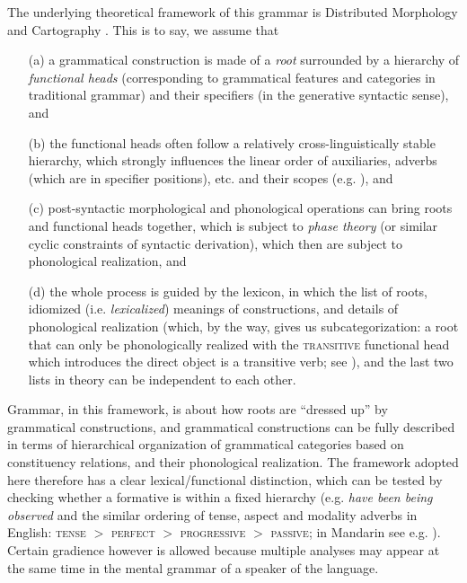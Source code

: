 \documentclass[UTF8, a4paper, oneside, scheme=plain, 12pt]{ctexrep}
\newcommand*{\textgt}{$>$ }
\newcommand*{\term}[1]{\emph{#1}}
\newcommand{\form}[1]{\emph{#1}}
\newcommand*{\category}[1]{\textsc{#1}}
\begin{document}
{
\small
The underlying theoretical framework of this grammar is Distributed Morphology \citep{siddiqi2009syntax} and Cartography \citep{cinque1999adverbs}.
This is to say, we assume that
\begin{itemize}
    \item[(a)] a grammatical construction is made of a \emph{root} surrounded by a hierarchy of \emph{functional heads} (corresponding to grammatical features and categories in traditional grammar) and their specifiers (in the generative syntactic sense), and 
    \item[(b)] the functional heads often follow a relatively cross-linguistically stable hierarchy,
    which strongly influences the linear order of auxiliaries, adverbs (which are in specifier positions), etc. and their scopes
    (e.g. ), and 
    \item[(c)] post-syntactic morphological and phonological operations can bring roots and functional heads together,
    which is subject to \emph{phase theory} (or similar cyclic constraints of syntactic derivation),
    which then are subject to phonological realization, and 
    \item[(d)] the whole process is guided by the lexicon,
    in which the list of roots, idiomized (i.e. \term{lexicalized}) meanings of constructions,
    and details of phonological realization
    (which, by the way, gives us subcategorization:
    a root that can only be phonologically realized with the \category{transitive} functional head
    which introduces the direct object is a transitive verb; see \citealt{siddiqi2009syntax}),
    and the last two lists in theory can be independent to each other.
\end{itemize}

Grammar, in this framework, is about how roots are ``dressed up'' by grammatical constructions,
and grammatical constructions can be fully described
in terms of hierarchical organization of grammatical categories based on constituency relations, and their phonological realization.
The framework adopted here therefore has a clear lexical/functional distinction,
which can be tested by checking whether a formative is within a fixed hierarchy 
(e.g. \form{have been being observed} and the similar ordering of tense, aspect and modality adverbs in English: \category{tense} \textgt{}\category{perfect} \textgt{}\category{progressive} \textgt{}\category{passive}; 
in Mandarin see e.g. ).
Certain gradience however is allowed because multiple analyses may appear at the same time
in the mental grammar of a speaker of the language.

}
\end{document}
